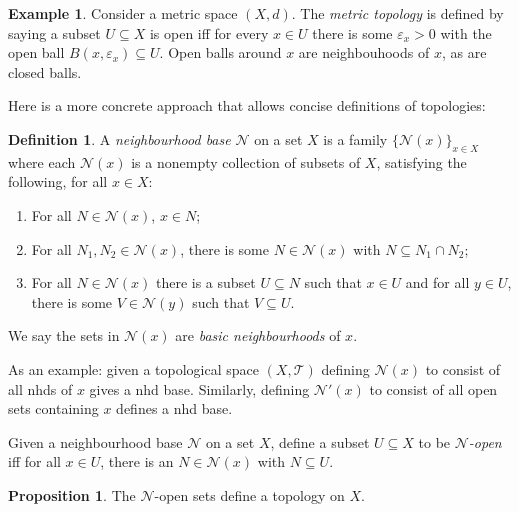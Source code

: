 \documentclass{tufte-handout}
\def\cT {\mathcal{T}}
\def\cN {\mathcal{N}}
\theoremstyle{definition}
\newtheorem{prop}{Proposition}
\newtheorem{definition}{Definition}
\newtheorem{example}{Example}
\begin{document}
\begin{example} 	
	Consider a metric space $(X,d)$. The \emph{metric topology} is defined by saying a 
	subset $U\subseteq X$ is open iff for every $x\in U$ there is some $\varepsilon_x > 
	0$ with the open ball $B(x,\varepsilon_x) \subseteq U$. Open balls around $x$ are 
	neighbouhoods of $x$, as are closed balls.
\end{example}

Here is a more concrete approach that allows concise definitions of topologies:

\begin{definition} 
	A \emph{neighbourhood base} $\cN$ on a set $X$ is a family 
	$\{\cN(x)\}_{x\in X}$ where each $\cN(x)$ is a nonempty collection of subsets of $X$, 
	satisfying the following, for all $x\in X$: 

	\begin{enumerate} 

	\item For all $N\in \cN(x)$, $x\in N$;
 
	\item For all $N_1,N_2 \in \cN(x)$, there is some $N\in \cN(x)$ with $N\subseteq N_1 
	\cap N_2$;

	\item For all $N\in \cN(x)$ there is a subset $U\subseteq N$ such that $x\in U$ and for 
	all $y\in U$, there is some $V \in \cN(y)$ such that $V\subseteq U$. 

	\end{enumerate} 

	We say the sets in $\cN(x)$ are \emph{basic neighbourhoods} of $x$. 
\end{definition}

As an example: given a topological space $(X,\cT)$ defining $\cN(x)$ to consist of all nhds 
of $x$ gives a nhd base. Similarly, defining $\cN'(x)$ to consist of all open sets 
containing $x$ defines a nhd base.


Given a neighbourhood base $\cN$ on a set $X$, define a subset $U\subseteq X$ to be 
\emph{$\cN$-open} iff for all $x\in U$, there is an $N\in \cN(x)$ with $N\subseteq U$.

\begin{prop} 
The $\cN$-open sets define a topology on $X$. 
\end{prop} 
\end{document}
